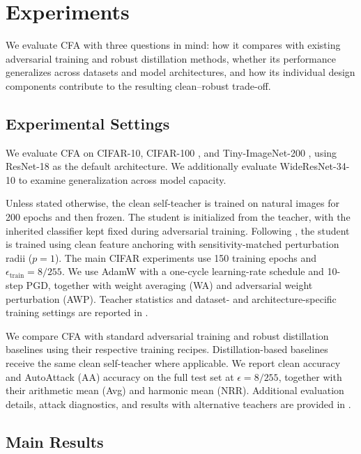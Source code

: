 \section{Experiments}
\label{sec:exp}

We evaluate CFA with three questions in mind: how it compares with existing
adversarial training and robust distillation methods, whether its performance
generalizes across datasets and model architectures, and how its individual
design components contribute to the resulting clean--robust trade-off.


\subsection{Experimental Settings}

We evaluate CFA on CIFAR-10, CIFAR-100
\citep{krizhevsky2009learning}, and Tiny-ImageNet-200
\citep{le2015tiny}, using ResNet-18 as the default architecture.
We additionally evaluate WideResNet-34-10 to examine generalization across
model capacity.

Unless stated otherwise, the clean self-teacher is trained on natural images
for 200 epochs and then frozen. The student is initialized from the teacher,
with the inherited classifier kept fixed during adversarial training.
Following , the student is trained using clean feature
anchoring with sensitivity-matched perturbation radii (\(p=1\)).
The main CIFAR experiments use 150 training epochs and
\(\epsilon_{\mathrm{train}}=8/255\).
We use AdamW with a one-cycle learning-rate schedule and 10-step PGD,
together with weight averaging (WA) and adversarial weight perturbation
(AWP). Teacher statistics and dataset- and architecture-specific training
settings are reported in .

We compare CFA with standard adversarial training and robust distillation
baselines using their respective training recipes. Distillation-based
baselines receive the same clean self-teacher where applicable.
We report clean accuracy and AutoAttack (AA) accuracy on the full test set at
\(\epsilon=8/255\), together with their arithmetic mean (Avg) and harmonic
mean (NRR). Additional evaluation details, attack diagnostics, and results
with alternative teachers are provided in
.


\subsection{Main Results}

